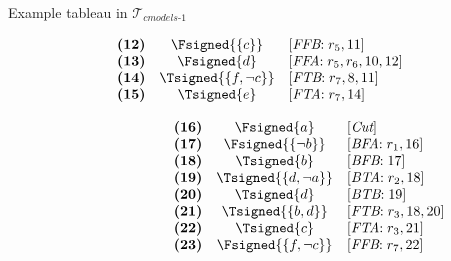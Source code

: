 \begin{frame}{Example tableau in $\mathcal{T}_{\textit{cmodels{-}1}}$}
\begin{center}
\begin{minipage}[t]{16cm}
\begin{minipage}[t]{4.5cm}
\[\begin{array}{lcl}
\textbf{(12)}                                      &
  \Fsigned{\{c\}}                                  &
  [\textit{FFB}{:}\;r_5, \text{11}]                \\
\textbf{(13)}                                      &
  \Fsigned{d}                                      &
  [\textit{FFA}{:}\;r_5,r_6, \text{10}, \text{12}] \\
\textbf{(14)}                                      &
  \Tsigned{\{f,\neg c\}}                   &
  [\textit{FTB}{:}\;r_7, \text{8}, \text{11}]      \\
\textbf{(15)}                                      &
  \Tsigned{e}                                      &
  [\textit{FTA}{:}\;r_7, \text{14}]
\end{array}
\]
\end{minipage}
%
\begin{minipage}[t]{6cm}
\[
\hspace{2.5cm}
\begin{array}{lcl}
\textbf{(16)}                                      &
  \Fsigned{a}                                      &
  [\textit{Cut}]                                   \\
\textbf{(17)}                                      &
  \Fsigned{\{\neg b\}}                     &
  [\textit{BFA}{:}\; r_1, \text{16}]               \\
\textbf{(18)}                                      &
  \Tsigned{b}                                      &
  [\textit{BFB}{:}\; \text{17}]                    \\
\textbf{(19)}                                      &
  \Tsigned{\{d,\neg a\}}                   &
  [\textit{BTA}{:}\;r_2, \text{18}]                \\
\textbf{(20)}                                      &
  \Tsigned{d}                                      &
  [\textit{BTB}{:}\;\text{19}]                     \\
\textbf{(21)}                                      &
  \Tsigned{\{b,d\}}                                &
  [\textit{FTB}{:}\;r_3, \text{18}, \text{20}]     \\
\textbf{(22)}                                      &
  \Tsigned{c}                                      &
  [\textit{FTA}{:}\;r_3, \text{21}]                \\
\textbf{(23)}                                      &
  \Fsigned{\{f,\neg c\}}                   &
  [\textit{FFB}{:}\;r_7, \text{22}]                \\

\end{array}\]
\end{minipage}
\end{minipage}
\end{center}
\end{frame}

